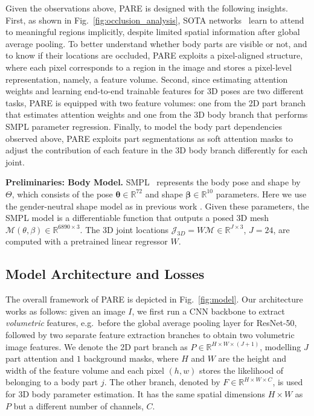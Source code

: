 \documentclass[10pt,twocolumn,letterpaper,usenames,dvipsnames]{article}
\newcommand{\gtShape}{\mathbf{\beta}}
\newcommand{\gtPose}{\mathbf{\theta}}
\newcommand{\methodname}{PARE\xspace}
\newcommand{\real}{\mathbb{R}}
\renewcommand{\eg}{e.g.\xspace}
\begin{document}
Given the observations above, {\methodname} is designed with the following insights.
First, as shown in Fig.~\ref{fig:occlusion_analysis}, SOTA networks~\cite{kanazawa_hmr,kocabas2019vibe,SPIN:ICCV:2019} learn to attend to meaningful regions implicitly, despite limited spatial information after global average pooling.
To better understand whether body parts are visible or not, and to know if their locations are occluded, {\methodname} exploits a pixel-aligned structure, where each pixel corresponds to a region in the image and stores a pixel-level representation, namely, a feature volume.
Second, since estimating attention weights and learning end-to-end trainable features for 3D poses are two different tasks, {\methodname} is equipped with two feature volumes: one from the 2D part branch that estimates attention weights and one from the 3D body branch that performs SMPL parameter regression.
Finally, to model the body part dependencies observed above, {\methodname} exploits part segmentations as soft attention masks to adjust the contribution of each feature in the 3D body branch differently for each joint. 

\textbf{Preliminaries: Body Model.}
\label{sec:body_model}
SMPL~\cite{looper_smpl} represents the body pose and shape by $\Theta$, which consists of the pose $\gtPose \in \real^{72}$ and shape $\gtShape \in \real^{10}$ parameters. 
Here we use the gender-neutral shape model as in previous work \cite{kanazawa_hmr,SPIN:ICCV:2019}.
Given these parameters, the SMPL model is a differentiable function that outputs a posed 3D mesh $\mathcal{M}(\theta,\beta) \in \real^{6890 \times 3}$.
The 3D joint locations $\mathcal{J}_\mathit{3D}=W \mathcal{M} \in \real^{J\times3}$, $J=24$, are computed with a pretrained linear regressor $W$.

\subsection{Model Architecture and Losses}
\label{sec:model}
The overall framework of {\methodname} is depicted in Fig.~\ref{fig:model}. 
Our architecture works as follows: given an image $I$, we first run a CNN backbone to extract \emph{volumetric} features, \eg~before the global average pooling layer
for ResNet-50, followed by two separate feature extraction branches to obtain two volumetric image features. 
We denote the 2D part branch as $P \in \mathbb{R}^{H\times W \times (J+1)}$, modelling $J$ part attention and $1$ background masks, where $H$ and $W$ are the height and width of the feature volume and each pixel $(h,w)$ stores the likelihood 
of belonging to a body part $j$. 
The other branch, denoted by $F \in \mathbb{R}^{H\times W \times C}$, is used for 3D body parameter estimation.
It has the same spatial dimensions $H\times W$ as $P$ but a different number of channels, $C$.
\end{document}
